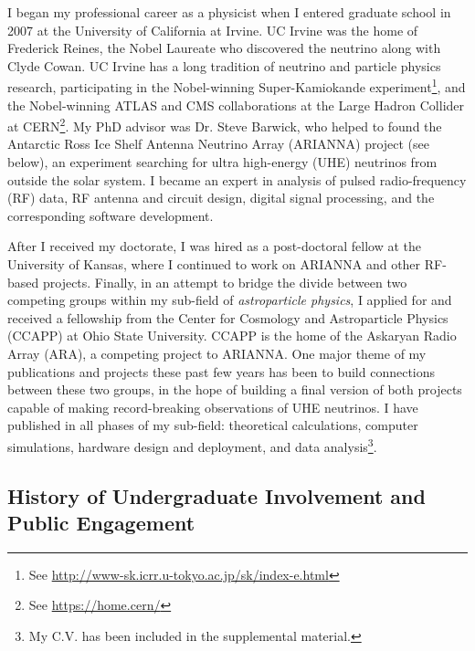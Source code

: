 \documentclass[../../main.tex]{subfiles}
\begin{document}
I began my professional career as a physicist when I entered graduate school in 2007 at the University of California at Irvine.  UC Irvine was the home of Frederick Reines, the Nobel Laureate who discovered the neutrino along with Clyde Cowan.  UC Irvine has a long tradition of neutrino and particle physics research, participating in the Nobel-winning Super-Kamiokande experiment\footnote{See \url{http://www-sk.icrr.u-tokyo.ac.jp/sk/index-e.html}}, and the Nobel-winning ATLAS and CMS collaborations at the Large Hadron Collider at CERN\footnote{See \url{https://home.cern/}}.  My PhD advisor was Dr. Steve Barwick, who helped to found the Antarctic Ross Ice Shelf Antenna Neutrino Array (ARIANNA) project (see below), an experiment searching for ultra high-energy (UHE) neutrinos from outside the solar system.  I became an expert in analysis of pulsed radio-frequency (RF) data, RF antenna and circuit design, digital signal processing, and the corresponding software development.  \\ \hspace{0.1cm}

After I received my doctorate, I was hired as a post-doctoral fellow at the University of Kansas, where I continued to work on ARIANNA and other RF-based projects.  Finally, in an attempt to bridge the divide between two competing groups within my sub-field of \textit{astroparticle physics}, I applied for and received a fellowship from the Center for Cosmology and Astroparticle Physics (CCAPP) at Ohio State University.  CCAPP is the home of the Askaryan Radio Array (ARA), a competing project to ARIANNA.  One major theme of my publications and projects these past few years has been to build connections between these two groups, in the hope of building a final version of both projects capable of making record-breaking observations of UHE neutrinos.  I have published in all phases of my sub-field: theoretical calculations, computer simulations, hardware design and deployment, and data analysis\footnote{My C.V. has been included in the supplemental material.}.

\subsection{History of Undergraduate Involvement and Public Engagement}
\end{document}
